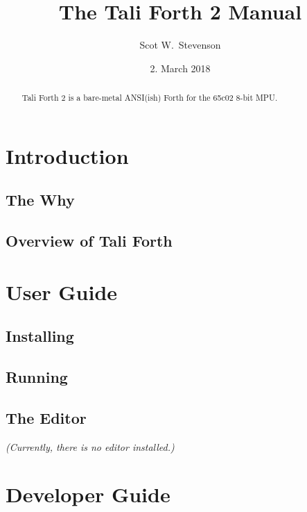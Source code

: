 \documentclass[a4paper,notitlepage]{report}
\title{The Tali Forth 2 Manual}
\author{Scot W.~Stevenson}
\date{2. March 2018}
\begin{document}
\maketitle

\begin{abstract}
Tali Forth 2 is a bare-metal ANSI(ish) Forth for the 65c02 8-bit MPU.
\end{abstract}

\tableofcontents
\listoffigures
\listoftables

\part{Introduction}

\chapter{The Why}
        

\chapter{Overview of Tali Forth}
        

\part{User Guide}

\chapter{Installing}
        

\chapter{Running}
        

\chapter{The Editor}
\textit{(Currently, there is no editor installed.)}


\part{Developer Guide}
\end{document}
